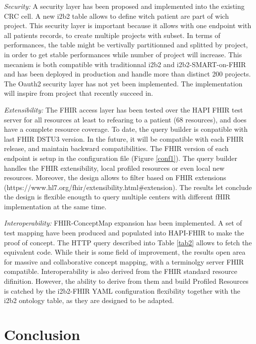 \documentclass{amia}
\begin{document}
\textit{Security: }A security layer has been proposed and implemented into the existing CRC cell. A new i2b2 table allows to define witch patient are part of wich project. This security layer is important because it allows with one endpoint with all patients records, to create multiple projects with subset. In terms of performances, the table might be vertivally partitionned and splitted by project, in order to get stable performances while number of project will increase. This mecanism is both compatible with traditionnal i2b2 and i2b2-SMART-on-FHIR and has been deployed in production and handle more than distinct 200 projects.
The Oauth2 security layer has not yet been implemented. The implementation will inspire from project\cite{ref2,ref3} that recently succeed in.

\textit{Extensibility:} The FHIR access layer has been tested over the HAPI FHIR test server for all resources at least to refearing to a patient (68 resources), and does have a complete resource coverage. To date, the query builder is conpatible with last FHIR DSTU3 version. In the future, it will be compatible with each FHIR release, and maintain backward compatibilities. The FHIR version of each endpoint is setup in the configuration file (Figure \ref{conf1}). The query builder handles the FHIR extensibility, local profiled resources or even local new resources. Moreover, the design allows to filter based on FHIR extensions (https://www.hl7.org/fhir/extensibility.html\#extension). The results let conclude the design is flexible enougth to query multiple centers with different fHIR implementation at the same time.

\textit{Interoperability: }FHIR-ConceptMap expansion has been implemented. A set of test mapping have been produced and populated into HAPI-FHIR to make the proof of concept. The HTTP query described into Table \ref{tab2} allows to fetch the equivalent code. While their is some field of improvement, the results open area for massive and collaborative concept mapping, with a terminolgy server FHIR compatible. 
Interoperability is also derived from the FHIR standard resource difinition. However, the ability to derive from them and build Profiled Resources is catched by the i2b2-FHIR YAML configuration flexibility together with the i2b2 ontology table, as they are designed to be adapted.


\section*{Conclusion} 
\end{document}
